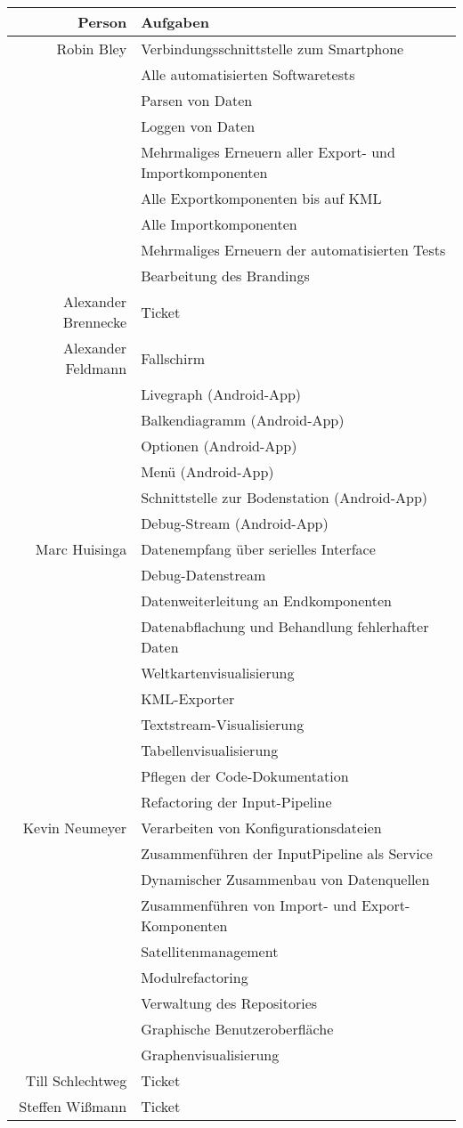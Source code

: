 \begin{table}[H]
	\centering
	\begin{tabular}{rl}
		\toprule
		\textbf{Person} & \textbf{Aufgaben} \\
		\midrule
		Robin Bley & Verbindungsschnittstelle zum Smartphone \\
		 & Alle automatisierten Softwaretests \\
		 & Parsen von Daten\\
		 & Loggen von Daten \\
		 & Mehrmaliges Erneuern aller Export- und Importkomponenten\\
		 & Alle Exportkomponenten bis auf KML \\
		 & Alle Importkomponenten\\
		 & Mehrmaliges Erneuern der automatisierten Tests\\
		 & Bearbeitung des Brandings\\
		Alexander Brennecke & Ticket \\
		Alexander Feldmann & Fallschirm \\
		 & Livegraph (Android-App) \\
		 & Balkendiagramm (Android-App) \\
		 & Optionen (Android-App) \\
		 & Menü (Android-App) \\
		 & Schnittstelle zur Bodenstation (Android-App) \\
		 & Debug-Stream (Android-App) \\
		Marc Huisinga & Datenempfang über serielles Interface \\
		 & Debug-Datenstream \\
		 & Datenweiterleitung an Endkomponenten \\
		 & Datenabflachung und Behandlung fehlerhafter Daten \\
		 & Weltkartenvisualisierung \\
		 & KML-Exporter \\
		 & Textstream-Visualisierung \\
		 & Tabellenvisualisierung \\
		 & Pflegen der Code-Dokumentation \\
		 & Refactoring der Input-Pipeline \\
		Kevin Neumeyer & Verarbeiten von Konfigurationsdateien \\
		 & Zusammenführen der InputPipeline als Service \\
		 & Dynamischer Zusammenbau von Datenquellen \\
		 & Zusammenführen von Import- und Export-Komponenten \\
		 & Satellitenmanagement \\
		 & Modulrefactoring \\
		 & Verwaltung des Repositories \\
		 & Graphische Benutzeroberfläche \\
		 & Graphenvisualisierung \\
		Till Schlechtweg & Ticket \\
		Steffen Wißmann & Ticket \\
		\bottomrule
	\end{tabular}
\end{table}

